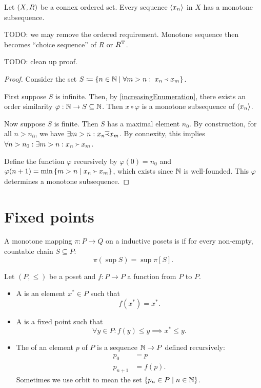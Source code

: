 \begin{proposition} \label{existenceMonotoneSubsequenceConnexRelation}
Let $\sSet{X,R}$ be a connex ordered set. Every sequence $\left\langle x_n \right\rangle$ in $X$ has a monotone subsequence.
\end{proposition}
TODO: we may remove the ordered requirement. Monotone sequence then becomes ``choice sequence'' of $R$ or $R^{\mathrm{T}}$.

TODO: clean up proof.
\begin{proof}
Consider the set $S\defeq \setbuilder{n\in \N}{\forall m > n: \; x_n \Yleft x_m}$.

First suppose $S$ is infinite. Then, by \ref{increasingEnumeration}, there exists an order similarity $\varphi: \mathbb{N} \to S \subseteq \mathbb{N}$. Then $x\circ \varphi$ is a monotone subsequence of $\left\langle x_n \right\rangle$.

Now suppose $S$ is finite. Then $S$ has a maximal element $n_0$. By construction, for all $n>n_0$, we have $\exists m > n: x_n \overline{\Yleft} x_m$. By connexity, this implies $\forall n>n_0: \exists m > n: x_n \Yright x_m$.

Define the function $\varphi$ recursively by $\varphi(0) = n_0$ and $\varphi(n+1) = \min\setbuilder{m>n}{x_n \Yright x_m}$, which exists since $\mathbb{N}$ is well-founded. This $\varphi$ determines a monotone subsequence.
\end{proof}


\chapter{Fixed points}

\begin{definition}
A monotone mapping $\pi : P \to Q$ on a inductive posets
 is  if for every non-empty, countable chain $S\subseteq P$:
 \[ \pi(\sup S) = \sup\pi[S]. \]
\end{definition}

\begin{definition}
Let $(P,\leq)$ be a poset and $f: P\to P$ a function from $P$ to $P$.
\begin{itemize}
\item A  is an element $x^*\in P$ such that
\[ f(x^*) = x^*. \]
\item A  is a fixed point such that
\[ \forall y\in P: f(y)\leq y \implies x^* \leq y. \]
\item The  of an element $p$ of $P$ is a sequence $\mathbb{N}\to P$ defined recursively:
\begin{align*}
p_0 &= p \\
p_{n+1} &= f(p).
\end{align*}
Sometimes we use orbit to mean the set $\{p_n\in P\;|\; n\in \mathbb{N}\}$.
\end{itemize}
\end{definition}

